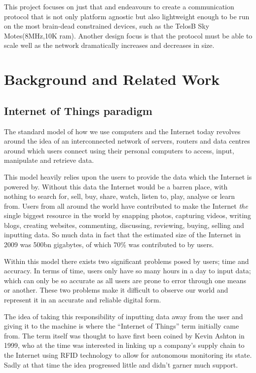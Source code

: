 \documentclass{l4proj}
\begin{document}
This project focuses on just that and endeavours to create a communication protocol that is not only platform agnostic but also lightweight enough to be run on the most brain-dead constrained devices, such as the TelosB Sky Motes(8MHz,10K ram)\cite{TelosB}. Another design focus is that the protocol must be able to scale well as the network dramatically increases and decreases in size.


\chapter{Background and Related Work} %
\label{cha:background}

\section{Internet of Things paradigm} %
\label{sec:internet_of_things_paradigm}


The standard model of how we use computers and the Internet today revolves around the idea of an interconnected network of servers, routers and data centres around which users connect using their personal computers to access, input, manipulate and retrieve data. 

This model heavily relies upon the users to provide the data which the Internet is powered by. Without this data the Internet would be a barren place, with nothing to search for, sell, buy, share, watch, listen to, play, analyse or learn from.
Users from all around the world have contributed to make the Internet \textit{the} single biggest resource in the world by snapping photos, capturing videos, writing blogs, creating websites, commenting, discussing, reviewing, buying, selling and inputting data. So much data in fact that the estimated size of the Internet in 2009 was 500bn gigabytes, of which 70\% was contributed to by users.\cite{Size}   

Within this model there exists two significant problems posed by users; time and accuracy. In terms of time, users only have so many hours in a day to input data; which can only be so accurate as all users are prone to error through one means or another.
These two problems make it difficult to observe our world and represent it in an accurate and reliable digital form.

The idea of taking this responsibility of inputting data away from the user and giving it to the machine is where the ``Internet of Things'' term initially came from. The term itself was thought to have first been coined by Kevin Ashton\cite{K.Ashton} in 1999, who at the time was interested in linking up a company's supply chain to the Internet using RFID technology to allow for autonomous monitoring its state.
Sadly at that time the idea progressed little and didn't garner much support.
\end{document}
